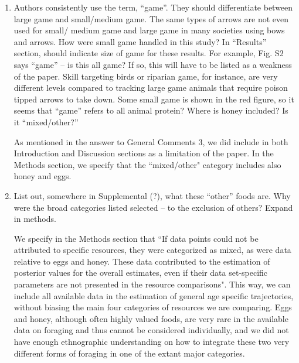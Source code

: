 \documentclass{article}
\newcommand{\rev}[1]{{\color{ForestGreen}#1}}
\begin{document}
\begin{enumerate}
    \item Authors consistently use the term, “game”. They should differentiate between large game and small/medium game. The same types of arrows are not even used for small/ medium game and large game in many societies using bows and arrows. How were small game handled in this study? In “Results” section, should indicate size of game for these results. For example, Fig. S2 says “game” – is this all game? If so, this will have to be listed as a weakness of the paper. Skill targeting birds or riparian game, for instance, are very different levels compared to tracking large game animals that require poison tipped arrows to take down. Some small game is shown in the red figure, so it seems that “game” refers to all animal protein? Where is honey included? Is it ``mixed/other?”

\rev{As mentioned in the answer to General Comments 3, we did include in both Introduction and Discussion sections as a limitation of the paper. In the Methods section, we specify that the ``mixed/other" category includes also honey and eggs.}

    \item List out, somewhere in Supplemental (?), what these ``other” foods are. Why were the broad categories listed selected – to the exclusion of others? Expand in methods.
    
\rev{We specify in the Methods section that ``If data points could not be attributed to specific resources, they were categorized as mixed, as were data relative to eggs and honey. These data contributed to the estimation of posterior values for the overall estimates, even if their data set-specific parameters are not presented in the resource comparisons". This way, we can include all available data in the estimation of general age specific trajectories, without biasing the main four categories of resources we are comparing. Eggs and honey, although often highly valued foods, are very rare in the available data on foraging and thus cannot be considered individually, and we did not have enough ethnographic understanding on how to integrate these two very different forms of foraging in one of the extant major categories.}


\end{enumerate}
\end{document}
